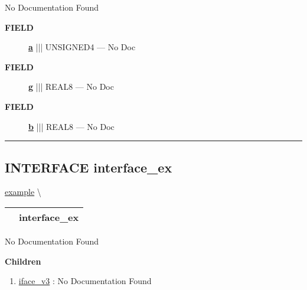 \par





No Documentation Found







\par
\begin{description}
\item [\colorbox{tagtype}{\color{white} \textbf{\textsf{FIELD}}}] \textbf{\underline{a}} ||| UNSIGNED4 --- No Doc
\item [\colorbox{tagtype}{\color{white} \textbf{\textsf{FIELD}}}] \textbf{\underline{g}} ||| REAL8 --- No Doc
\item [\colorbox{tagtype}{\color{white} \textbf{\textsf{FIELD}}}] \textbf{\underline{b}} ||| REAL8 --- No Doc
\end{description}





\rule{\linewidth}{0.5pt}
\subsection*{\textsf{\colorbox{headtoc}{\color{white} INTERFACE}
interface\_ex}}

\hypertarget{ecldoc:example.interface_ex}{}
\hspace{0pt} \hyperlink{ecldoc:example}{example} \textbackslash 

{\renewcommand{\arraystretch}{1.5}
\begin{tabularx}{\textwidth}{|>{\raggedright\arraybackslash}l|X|}
\hline
\hspace{0pt}\mytexttt{\color{red} } & \textbf{interface\_ex} \\
\hline
\end{tabularx}
}

\par





No Documentation Found







\textbf{Children}
\begin{enumerate}
\item \hyperlink{ecldoc:example.interface_ex.iface_v3}{iface\_v3}
: No Documentation Found
\end{enumerate}

